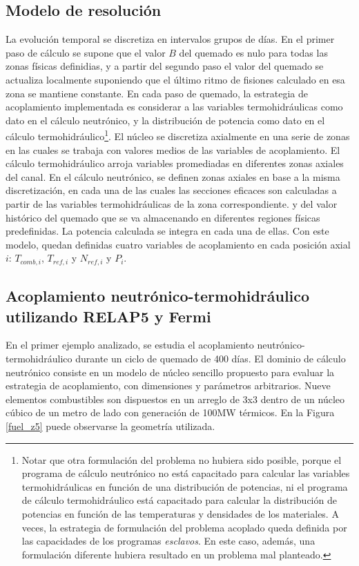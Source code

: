 \subsection*{Modelo de resolución}
\label{3:modelo-nt}

La evolución temporal se discretiza en intervalos grupos de días.
En el primer paso de cálculo se supone que el valor $B$ del quemado es nulo para todas las zonas físicas definidias,
y a partir del segundo paso el valor del quemado se actualiza localmente suponiendo que el último ritmo de fisiones calculado en esa zona se mantiene constante.
En cada paso de quemado,
la estrategia de acoplamiento implementada es considerar a las variables termohidráulicas como dato en el cálculo neutrónico,
y la distribución de potencia como dato en el cálculo termohidráulico\footnote{
Notar que otra formulación del problema no hubiera sido posible,
porque el programa de cálculo neutrónico no está capacitado para calcular las variables termohidráulicas en función de una distribución de potencias,
ni el programa de cálculo termohidráulico está capacitado para calcular la distribución de potencias en función de las temperaturas y densidades de los materiales.
A veces, la estrategia de formulación del problema acoplado queda definida por las capacidades de los programas \textit{esclavos}.
En este caso, además, una formulación diferente hubiera resultado en un problema mal planteado.
}.
El núcleo se discretiza axialmente en una serie de zonas en las cuales se trabaja con valores medios de las variables de acoplamiento.
El cálculo termohidráulico arroja variables promediadas en diferentes zonas axiales del canal.
En el cálculo neutrónico, se definen zonas axiales en base a la misma discretización,
en cada una de las cuales las secciones eficaces son calculadas a partir de las variables termohidráulicas de la zona correspondiente.
y del valor histórico del quemado que se va almacenando en diferentes regiones físicas predefinidas.
La potencia calculada se integra en cada una de ellas.
Con este modelo, quedan definidas cuatro variables de acoplamiento en cada posición axial $i$: $T_{comb,i}$, $T_{ref,i}$ y $N_{ref,i}$ y $P_i$.

\subsection*{Acoplamiento neutrónico-termohidráulico utilizando \textbf{RELAP5} y \textbf{Fermi}}
\label{3:relap-fermi}

En el primer ejemplo analizado, se estudia el acoplamiento neutrónico-termohidráulico durante un ciclo de quemado de 400 días.
El dominio de cálculo neutrónico consiste en un modelo de núcleo sencillo propuesto para evaluar la estrategia de acoplamiento,
con dimensiones y parámetros arbitrarios.
Nueve elementos combustibles son dispuestos en un arreglo de 3x3 dentro de un núcleo cúbico de un metro de lado con generación de 100MW térmicos.
En la Figura \ref{fuel_z5} puede observarse la geometría utilizada.

